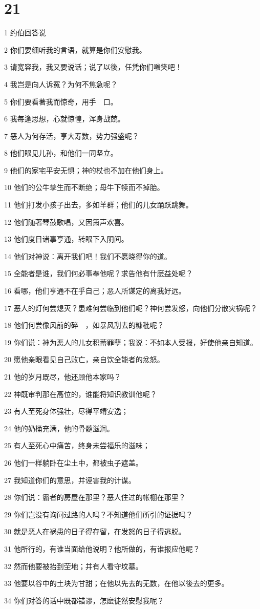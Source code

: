 \chapter{21}

\par 1 约伯回答说
\par 2 你们要细听我的言语，就算是你们安慰我。
\par 3 请宽容我，我又要说话；说了以後，任凭你们嗤笑吧！
\par 4 我岂是向人诉冤？为何不焦急呢？
\par 5 你们要看著我而惊奇，用手　口。
\par 6 我每逢思想，心就惊惶，浑身战兢。
\par 7 恶人为何存活，享大寿数，势力强盛呢？
\par 8 他们眼见儿孙，和他们一同坚立。
\par 9 他们的家宅平安无惧；神的杖也不加在他们身上。
\par 10 他们的公牛孳生而不断绝；母牛下犊而不掉胎。
\par 11 他们打发小孩子出去，多如羊群；他们的儿女踊跃跳舞。
\par 12 他们随著琴鼓歌唱，又因箫声欢喜。
\par 13 他们度日诸事亨通，转眼下入阴间。
\par 14 他们对神说：离开我们吧！我们不愿晓得你的道。
\par 15 全能者是谁，我们何必事奉他呢？求告他有什麽益处呢？
\par 16 看哪，他们亨通不在乎自己；恶人所谋定的离我好远。
\par 17 恶人的灯何尝熄灭？患难何尝临到他们呢？神何尝发怒，向他们分散灾祸呢？
\par 18 他们何尝像风前的碎　，如暴风刮去的糠秕呢？
\par 19 你们说：神为恶人的儿女积蓄罪孽；我说：不如本人受报，好使他亲自知道。
\par 20 愿他亲眼看见自己败亡，亲自饮全能者的忿怒。
\par 21 他的岁月既尽，他还顾他本家吗？
\par 22 神既审判那在高位的，谁能将知识教训他呢？
\par 23 有人至死身体强壮，尽得平靖安逸；
\par 24 他的奶桶充满，他的骨髓滋润。
\par 25 有人至死心中痛苦，终身未尝福乐的滋味；
\par 26 他们一样躺卧在尘土中，都被虫子遮盖。
\par 27 我知道你们的意思，并诬害我的计谋。
\par 28 你们说：霸者的房屋在那里？恶人住过的帐棚在那里？
\par 29 你们岂没有询问过路的人吗？不知道他们所引的证据吗？
\par 30 就是恶人在祸患的日子得存留，在发怒的日子得逃脱。
\par 31 他所行的，有谁当面给他说明？他所做的，有谁报应他呢？
\par 32 然而他要被抬到茔地；并有人看守坟墓。
\par 33 他要以谷中的土块为甘甜；在他以先去的无数，在他以後去的更多。
\par 34 你们对答的话中既都错谬，怎麽徒然安慰我呢？

